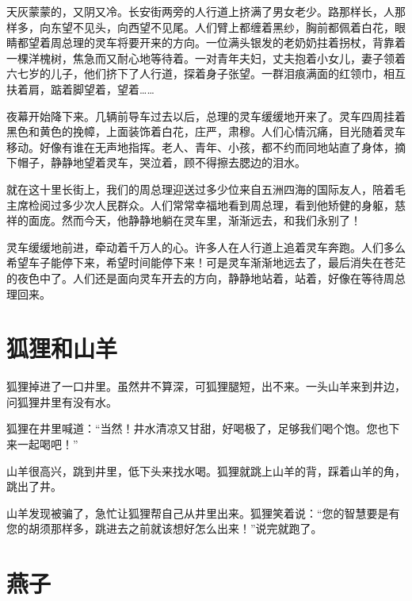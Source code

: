 \documentclass[12pt,UTF-8,openany]{ctexbook}
\begin{document}
\begin{Large}
    
    天灰蒙蒙的，又阴又冷。长安街两旁的人行道上挤满了男女老少。路那样长，人那样多，向东望不见头，向西望不见尾。人们臂上都缠着黑纱，胸前都佩着白花，眼睛都望着周总理的灵车将要开来的方向。一位满头银发的老奶奶拄着拐杖，背靠着一棵洋槐树，焦急而又耐心地等待着。一对青年夫妇，丈夫抱着小女儿，妻子领着六七岁的儿子，他们挤下了人行道，探着身子张望。一群泪痕满面的红领巾，相互扶着肩，踮着脚望着，望着……
    
    夜幕开始降下来。几辆前导车过去以后，总理的灵车缓缓地开来了。灵车四周挂着黑色和黄色的挽幛，上面装饰着白花，庄严，肃穆。人们心情沉痛，目光随着灵车移动。好像有谁在无声地指挥。老人、青年、小孩，都不约而同地站直了身体，摘下帽子，静静地望着灵车，哭泣着，顾不得擦去腮边的泪水。
    
    就在这十里长街上，我们的周总理迎送过多少位来自五洲四海的国际友人，陪着毛主席检阅过多少次人民群众。人们常常幸福地看到周总理，看到他矫健的身躯，慈祥的面庞。然而今天，他静静地躺在灵车里，渐渐远去，和我们永别了！
    
    灵车缓缓地前进，牵动着千万人的心。许多人在人行道上追着灵车奔跑。人们多么希望车子能停下来，希望时间能停下来！可是灵车渐渐地远去了，最后消失在苍茫的夜色中了。人们还是面向灵车开去的方向，静静地站着，站着，好像在等待周总理回来。
    
\end{Large}

\chapter{狐狸和山羊}

\begin{Large}
    
    狐狸掉进了一口井里。虽然井不算深，可狐狸腿短，出不来。一头山羊来到井边，问狐狸井里有没有水。
    
    狐狸在井里喊道：“当然！井水清凉又甘甜，好喝极了，足够我们喝个饱。您也下来一起喝吧！”
    
    山羊很高兴，跳到井里，低下头来找水喝。狐狸就跳上山羊的背，踩着山羊的角，跳出了井。
    
    山羊发现被骗了，急忙让狐狸帮自己从井里出来。狐狸笑着说：“您的智慧要是有您的胡须那样多，跳进去之前就该想好怎么出来！”说完就跑了。
    
\end{Large}

\chapter{燕子}
\end{document}
